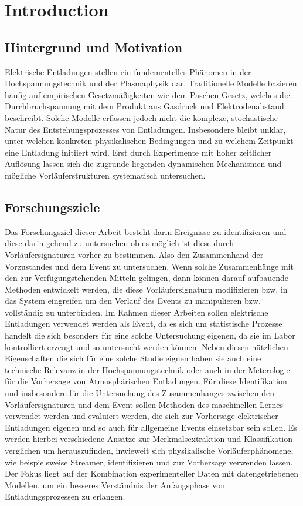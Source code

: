 \chapter{Introduction}
\label{chap:introduction}

\section{Hintergrund und Motivation}
\label{sec:background}

Elektrische Entladungen stellen ein fundementelles Phänomen in der Hochspannungstechnik und der Plasmaphysik dar. Traditionelle Modelle basieren häufig auf empirischen Gesetzmäßigkeiten wie dem Paschen Gesetz, welches die Durchbruchspannung mit dem Produkt aus Gasdruck und Elektrodenabstand beschreibt. Solche Modelle erfassen jedoch nicht die komplexe, stochastische Natur des Entstehungsprozesses von Entladungen. Insbesondere bleibt unklar, unter welchen konkreten physikalischen Bedingungen und zu welchem Zeitpunkt eine Entladung initiiert wird. Erst durch Experimente mit hoher zeitlicher Auflösung lassen sich die zugrunde liegenden dynamischen Mechanismen und mögliche Vorläuferstrukturen systematisch untersuchen.

\section{Forschungsziele}
\label{sec:objectives}
Das Forschungsziel dieser Arbeit besteht darin Ereignisse zu identifizieren und diese darin gehend zu untersuchen ob es möglich ist diese durch Vorläufersignaturen vorher zu bestimmen. Also den Zusammenhand der Vorzustandes und dem Event zu untersuchen. Wenn solche Zusammenhänge mit den zur Verfügungstehenden Mitteln gelingen, dann können darauf aufbauende Methoden entwickelt werden, die diese Vorläufersignaturn modifizieren bzw. in das System eingreifen um den Verlauf des Events zu manipulieren bzw. vollständig zu unterbinden. Im Rahmen dieser Arbeiten sollen elektrische Entladungen verwendet werden als Event, da es sich um statistische Prozesse handelt die sich besonders für eine solche Untersuchung eigenen, da sie im Labor kontrolliert erzeugt und so untersucht werden können. Neben diesen nützlichen Eigenschaften die sich für eine solche Studie eignen haben sie auch eine technische Relevanz in der Hochspannungstechnik oder auch in der Meterologie für die Vorhersage von Atmosphärischen Entladungen. Für diese Identifikation und insbesondere für die Untersuchung des Zusammenhanges zwischen den Vorläufersignaturen und dem Event sollen Methoden des maschinellen Lernes verwendet werden und evaluiert werden, die sich zur Vorhersage elektrischer Entladungen eigenen und so auch für allgemeine Events einsetzbar sein sollen. Es werden hierbei verschiedene Ansätze zur Merkmalsextraktion und Klassifikation verglichen um herauszufinden, inwieweit sich physikalische Vorläuferphänomene, wie beispielsweise Streamer, identifizieren und zur Vorhersage verwenden lassen. Der Fokus liegt auf der Kombination experimenteller Daten mit datengetriebenen Modellen, um ein besseres Verständnis der Anfangsphase von Entladungsprozessen zu erlangen.

